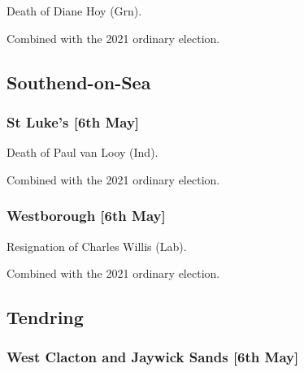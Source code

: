 \documentclass[a4paper,openany]{book}
\begin{document}
\begin{resultsiii}

Death of Diane Hoy (Grn).

Combined with the 2021 ordinary election.

\subsection*{Southend-on-Sea}

\subsubsection*{St Luke's \hspace*{\fill}\nolinebreak[1]%
	\enspace\hspace*{\fill}
	[6th May]}


Death of Paul van Looy (Ind).

Combined with the 2021 ordinary election.

\subsubsection*{Westborough \hspace*{\fill}\nolinebreak[1]%
	\enspace\hspace*{\fill}
	[6th May]}


Resignation of Charles Willis (Lab).

Combined with the 2021 ordinary election.

\subsection*{Tendring}

\subsubsection*{West Clacton and Jaywick Sands \hspace*{\fill}\nolinebreak[1]%
	\enspace\hspace*{\fill}
	[6th May]}



\end{resultsiii}
\end{document}
